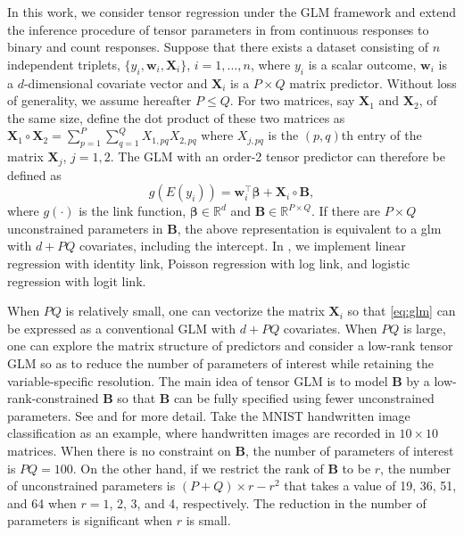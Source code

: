 In this work, we consider tensor regression under the GLM framework and
extend the inference procedure of tensor parameters in
\citet{ChangYang2021bioinformatics} from continuous responses to binary
and count responses. Suppose that there exists a dataset consisting of
\(n\) independent triplets, \(\{y_i, \mathbf{w}_i, \mathbf{X}_i\}\),
\(i=1,\dots,n\), where \(y_i\) is a scalar outcome, \(\mathbf{w}_i\) is
a \(d\)-dimensional covariate vector and \(\mathbf{X}_i\) is a
\(P\times Q\) matrix predictor. Without loss of generality, we assume
hereafter \(P\leq Q\). For two matrices, say \(\mathbf{X}_1\) and
\(\mathbf{X}_2\), of the same size, define the dot product of these two
matrices as
\(\mathbf{X}_1 \circ \mathbf{X}_2 = \sum_{p=1}^P\sum_{q=1}^Q X_{1,pq}X_{2, pq}\)
where \(X_{j,pq}\) is the \((p,q)\)th entry of the matrix
\(\mathbf{X}_j\), \(j=1,2\). The GLM with an order-2 tensor predictor
can therefore be defined as \begin{equation} 
    g\left(E(y_i)\right) = \mathbf{w}_i^{\top}\boldsymbol{\beta} + \mathbf{X}_i \circ \mathbf{B}, \label{eq:glm}
\end{equation} where \(g(\cdot)\) is the link function,
\(\boldsymbol{\beta} \in \mathbb{R}^d\) and
\(\mathbf{B}\in\mathbb{R}^{P\times Q}\). If there are \(P\times Q\)
unconstrained parameters in \(\mathbf{B}\), the above representation is
equivalent to a glm with \(d + PQ\) covariates, including the intercept.
In , we implement linear regression with identity
link, Poisson regression with log link, and logistic regression with
logit link.

When \(PQ\) is relatively small, one can vectorize the matrix
\(\mathbf X_i\) so that \eqref{eq:glm} can be expressed as a conventional
GLM with \(d + PQ\) covariates. When \(PQ\) is large, one can explore
the matrix structure of predictors and consider a low-rank tensor GLM so
as to reduce the number of parameters of interest while retaining the
variable-specific resolution. The main idea of tensor GLM is to model
\(\mathbf{B}\) by a low-rank-constrained \(\mathbf{B}\) so that
\(\mathbf{B}\) can be fully specified using fewer unconstrained
parameters. See \citet{Hung2012MatrixLogistic} and
\citet{ChangYang2021bioinformatics} for more detail. Take the MNIST
handwritten image classification as an example, where handwritten images
are recorded in \(10 \times 10\) matrices. When there is no constraint
on \(\mathbf{B}\), the number of parameters of interest is \(PQ=100\).
On the other hand, if we restrict the rank of \(\mathbf B\) to be \(r\),
the number of unconstrained parameters is \((P + Q)\times r - r^2\) that
takes a value of 19, 36, 51, and 64 when \(r = 1\), 2, 3, and 4,
respectively. The reduction in the number of parameters is significant
when \(r\) is small.

